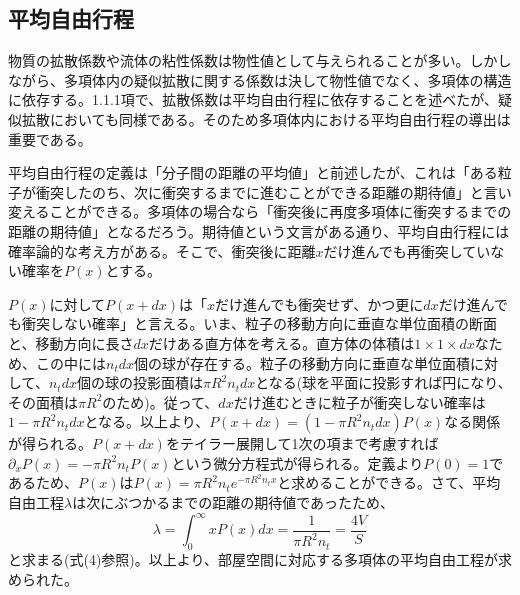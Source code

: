\documentclass[dvipdfmx, 9pt, a4paper]{jsarticle}
\begin{document}
\subsection{平均自由行程}
物質の拡散係数や流体の粘性係数は物性値として与えられることが多い。しかしながら、多項体内の疑似拡散に関する係数は決して物性値でなく、多項体の構造に依存する。1.1.1項で、拡散係数は平均自由行程に依存することを述べたが、疑似拡散においても同様である。そのため多項体内における平均自由行程の導出は重要である。\par
平均自由行程の定義は「分子間の距離の平均値」と前述したが、これは「ある粒子が衝突したのち、次に衝突するまでに進むことができる距離の期待値」と言い変えることができる。多項体の場合なら「衝突後に再度多項体に衝突するまでの距離の期待値」となるだろう。期待値という文言がある通り、平均自由行程には確率論的な考え方がある。そこで、衝突後に距離$x$だけ進んでも再衝突していない確率を$P(x)$とする。\par
$P(x)$に対して$P(x+dx)$は「$x$だけ進んでも衝突せず、かつ更に$dx$だけ進んでも衝突しない確率」と言える。いま、粒子の移動方向に垂直な単位面積の断面と、移動方向に長さ$dx$だけある直方体を考える。直方体の体積は$1 \times 1 \times dx$なため、この中には$n_tdx$個の球が存在する。粒子の移動方向に垂直な単位面積に対して、$n_tdx$個の球の投影面積は$\pi R^2n_t dx$となる(球を平面に投影すれば円になり、その面積は$\pi R^2$のため)。従って、$dx$だけ進むときに粒子が衝突しない確率は$1-\pi R^2 n_t dx$となる。以上より、$P(x+dx)=(1-\pi R^2 n_t dx)P(x)$なる関係が得られる。$P(x+dx)$をテイラー展開して1次の項まで考慮すれば$\partial_xP(x)=-\pi R^2 n_t P(x)$という微分方程式が得られる。定義より$P(0)=1$であるため、$P(x)$は$P(x)=\pi R^2 n_te^{-\pi R^2 n_t x}$と求めることができる。さて、平均自由工程$\lambda$は次にぶつかるまでの距離の期待値であったため、
\begin{equation}
\lambda=\int_0^\infty xP(x)dx=\frac{1}{\pi R^2 n_t}=\frac{4V}{S}
\end{equation}
と求まる(式(4)参照)。以上より、部屋空間に対応する多項体の平均自由工程が求められた。
\end{document}
